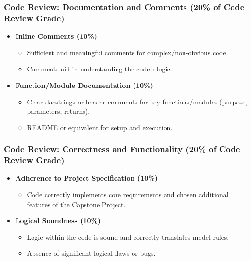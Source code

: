 \documentclass{beamer}
\begin{document}
\begin{frame}[t]
\frametitle{Code Review: Documentation and Comments (20\% of Code Review Grade)}
\begin{itemize}
    \item \textbf{Inline Comments (10\%)}
    \begin{itemize}
        \item Sufficient and meaningful comments for complex/non-obvious code.
        \item Comments aid in understanding the code's logic.
    \end{itemize}
    \vspace{0.5em}
    \item \textbf{Function/Module Documentation (10\%)}
    \begin{itemize}
        \item Clear docstrings or header comments for key functions/modules (purpose, parameters, returns).
        \item README or equivalent for setup and execution.
    \end{itemize}
\end{itemize}
\end{frame}


\begin{frame}[t]
\frametitle{Code Review: Correctness and Functionality (20\% of Code Review Grade)}
\begin{itemize}
    \item \textbf{Adherence to Project Specification (10\%)}
    \begin{itemize}
        \item Code correctly implements core requirements and chosen additional features of the Capstone Project.
    \end{itemize}
    \vspace{0.5em}
    \item \textbf{Logical Soundness (10\%)}
    \begin{itemize}
        \item Logic within the code is sound and correctly translates model rules.
        \item Absence of significant logical flaws or bugs.
    \end{itemize}
\end{itemize}
\end{frame}
\end{document}
